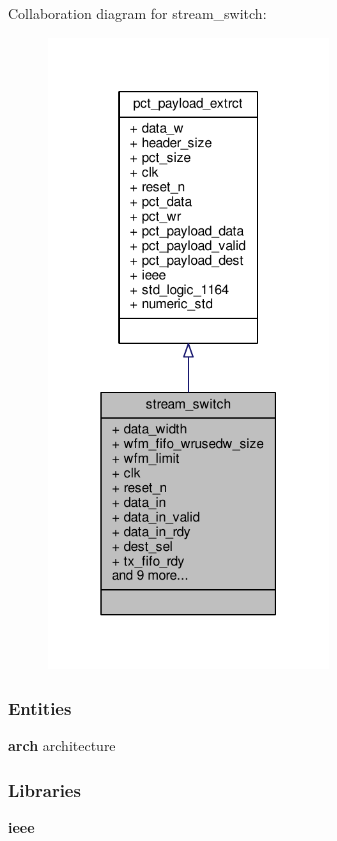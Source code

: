 Collaboration diagram for stream\+\_\+switch\+:\nopagebreak
\begin{figure}[H]
\begin{center}
\leavevmode
\includegraphics[width=211pt]{d8/d9d/classstream__switch__coll__graph}
\end{center}
\end{figure}
\subsubsection*{Entities}
\begin{DoxyCompactItemize}
\item 
{\bf arch} architecture
\end{DoxyCompactItemize}
\subsubsection*{Libraries}
 \begin{DoxyCompactItemize}
\item 
{\bf ieee} 
\end{DoxyCompactItemize}
